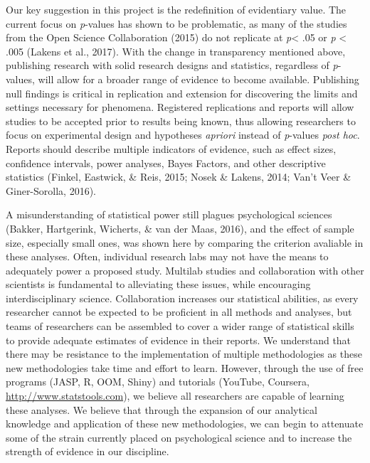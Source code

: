 \documentclass[english,man]{apa6}
\theoremstyle{definition}
\theoremstyle{definition}
\theoremstyle{definition}
\theoremstyle{remark}
\begin{document}
Our key suggestion in this project is the redefinition of evidentiary
value. The current focus on \emph{p}-values has shown to be problematic,
as many of the studies from the Open Science Collaboration (2015) do not
replicate at \emph{p}\textless{} .05 or \emph{p} \textless{} .005
(Lakens et al., 2017). With the change in transparency mentioned above,
publishing research with solid research designs and statistics,
regardless of \emph{p}-values, will allow for a broader range of
evidence to become available. Publishing null findings is critical in
replication and extension for discovering the limits and settings
necessary for phenomena. Registered replications and reports will allow
studies to be accepted prior to results being known, thus allowing
researchers to focus on experimental design and hypotheses
\emph{apriori} instead of \emph{p}-values \emph{post hoc}. Reports
should describe multiple indicators of evidence, such as effect sizes,
confidence intervals, power analyses, Bayes Factors, and other
descriptive statistics (Finkel, Eastwick, \& Reis, 2015; Nosek \&
Lakens, 2014; Van't Veer \& Giner-Sorolla, 2016).

A misunderstanding of statistical power still plagues psychological
sciences (Bakker, Hartgerink, Wicherts, \& van der Maas, 2016), and the
effect of sample size, especially small ones, was shown here by
comparing the criterion avaliable in these analyses. Often, individual
research labs may not have the means to adequately power a proposed
study. Multilab studies and collaboration with other scientists is
fundamental to alleviating these issues, while encouraging
interdisciplinary science. Collaboration increases our statistical
abilities, as every researcher cannot be expected to be proficient in
all methods and analyses, but teams of researchers can be assembled to
cover a wider range of statistical skills to provide adequate estimates
of evidence in their reports. We understand that there may be resistance
to the implementation of multiple methodologies as these new
methodologies take time and effort to learn. However, through the use of
free programs (JASP, R, OOM, Shiny) and tutorials (YouTube, Coursera,
\url{http://www.statstools.com}), we believe all researchers are capable
of learning these analyses. We believe that through the expansion of our
analytical knowledge and application of these new methodologies, we can
begin to attenuate some of the strain currently placed on psychological
science and to increase the strength of evidence in our discipline.
\end{document}
